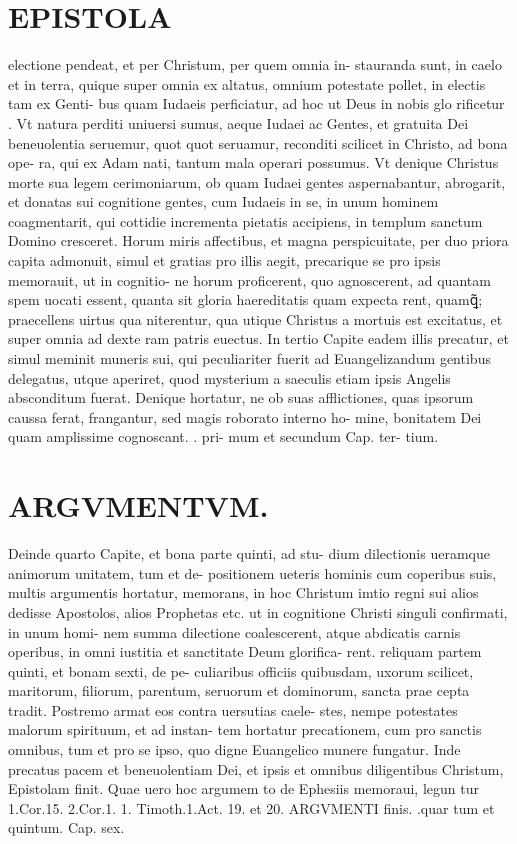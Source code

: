 \documentclass{article}
\begin{document}
\begin{pages}
\section*{EPISTOLA }\pstart electione pendeat, et per Christum, per quem omnia in- stauranda sunt, in caelo et in terra, quique super omnia ex altatus, omnium potestate pollet, in electis tam ex Genti- bus quam Iudaeis perficiatur, ad hoc ut Deus in nobis glo rificetur .  Vt natura perditi uniuersi sumus, aeque Iudaei ac Gentes, et gratuita Dei beneuolentia seruemur, quot quot seruamur, reconditi scilicet in Christo, ad bona ope- ra, qui ex Adam nati, tantum mala operari possumus.  Vt denique Christus morte sua legem cerimoniarum, ob quam Iudaei gentes aspernabantur, abrogarit, et donatas sui cognitione gentes, cum Iudaeis in se, in unum hominem coagmentarit, qui cottidie incrementa pietatis accipiens, in templum sanctum Domino cresceret.   \pend\pstart Horum miris affectibus, et magna perspicuitate, per duo priora capita admonuit, simul et gratias pro illis aegit, precarique se pro ipsis memorauit, ut in cognitio- ne horum proficerent, quo agnoscerent, ad quantam spem uocati essent, quanta sit gloria haereditatis quam expecta rent, quamꝗ̃; praecellens uirtus qua niterentur, qua utique Christus a mortuis est excitatus, et super omnia ad dexte ram patris euectus.  In tertio Capite eadem illis precatur, et simul meminit muneris sui, qui peculiariter fuerit ad Euangelizandum gentibus delegatus, utque aperiret, quod mysterium a saeculis etiam ipsis Angelis absconditum fuerat.  Denique hortatur, ne ob suas afflictiones, quas ipsorum caussa ferat, frangantur, sed magis roborato interno ho- mine, bonitatem Dei quam amplissime cognoscant.   \pendCap. pri- mum et secundum Cap.  ter- tium.  
\section*{ARGVMENTVM.  }\pstart Deinde quarto Capite, et bona parte quinti, ad stu- dium dilectionis ueramque animorum unitatem, tum et de- positionem ueteris hominis cum coperibus suis, multis argumentis hortatur, memorans, in hoc Christum imtio regni sui alios dedisse Apostolos, alios Prophetas etc. ut in cognitione Christi singuli confirmati, in unum homi- nem summa dilectione coalescerent, atque abdicatis carnis operibus, in omni iustitia et sanctitate Deum glorifica- rent. reliquam partem quinti, et bonam sexti, de pe- culiaribus officiis quibusdam, uxorum scilicet, maritorum, filiorum, parentum, seruorum et dominorum, sancta prae cepta tradit.  Postremo armat eos contra uersutias caele- stes, nempe potestates malorum spirituum, et ad instan- tem hortatur precationem, cum pro sanctis omnibus, tum et pro se ipso, quo digne Euangelico munere fungatur.  Inde precatus pacem et beneuolentiam Dei, et ipsis et omnibus diligentibus Christum, Epistolam finit. Quae uero hoc argumem to de Ephesiis memoraui, legun tur 1.Cor.15. 2.Cor.1. 1. Timoth.1.Act. 19. et 20. ARGVMENTI finis.   \pendCap.quar tum et quintum. Cap.  sex.  

\end{pages}
\end{document}

